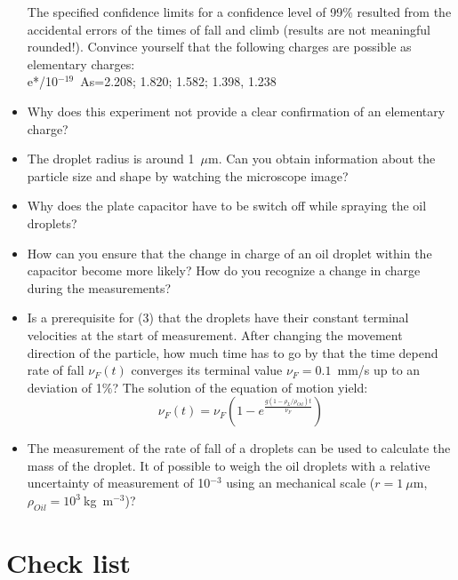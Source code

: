 \documentclass{tudphygp_eng}
\begin{document}
\begin{itemize}
The specified confidence limits for a confidence level of 99$\%$ resulted from the accidental errors of the times of fall and climb (results are not meaningful rounded!). Convince yourself that the following charges are possible as elementary charges:\\
e*/10$^{-19}$~As=2.208; 1.820; 1.582; 1.398, 1.238

\item Why does this experiment not provide a clear confirmation of an elementary charge?

\item The droplet radius is around 1~$\mu$m. Can you obtain information about the particle size and shape by watching the microscope image?

\item Why does the plate capacitor have to be switch off while spraying the oil droplets?

\item How can you ensure that the change in charge of an oil droplet within the capacitor become more likely? How do you recognize a change in charge during the measurements?

\item Is a prerequisite for (3) that the droplets have their constant terminal velocities at the start of measurement. After changing the movement direction of the particle, how much time has to go by that the time depend rate of fall ${\nu_F}(t)$ converges its terminal value ${\nu_F}=0.1$~mm/s up to an deviation of 1$\%$? The solution of the equation of motion yield:
\begin{equation*}
{\nu_F}(t)={\nu_F}\left(1-e^{\frac{g(1-{\rho_L}/{\rho_{Oil}})t}{\nu_F}}\right)
\end{equation*}

\item The measurement of the rate of fall of a droplets can be used to calculate the mass of the droplet. It of possible to weigh the oil droplets with a relative uncertainty of measurement of 10$^{-3}$ using an mechanical scale ($r=1~{\mu}$m, $\rho_{Oil}={10^3}~$kg~m$^{-3}$)?



\end{itemize}


\section{Check list}
\end{document}
